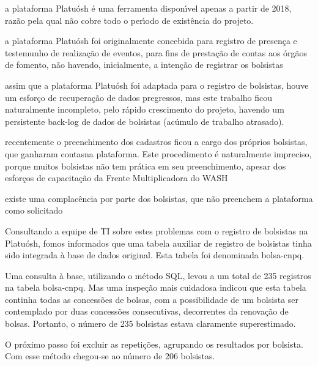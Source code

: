 \documentclass[
12pt,		%
openright,	%
twoside,  %
a4paper,			%
chapter=TITLE,		%
english,			%
french,				%
spanish,			%
brazil				%
]{USPSC-classe/USPSC}
\begin{document}
\begin{alineas}
\item a plataforma Platu\'osh \'e uma ferramenta dispon\'{\i}vel apenas a partir de 2018, raz\~ao pela qual n\~ao cobre todo o per\'{\i}odo de exist\^encia do projeto.
\item a plataforma Platu\'osh foi originalmente concebida para registro de presen\c{c}a e testemunho de realiza\c{c}\~ao de eventos, para fins de presta\c{c}\~ao de contas aos \'org\~aos de fomento, n\~ao havendo, inicialmente, a inten\c{c}\~ao de registrar os bolsistas
\item assim que a plataforma Platu\'osh foi adaptada para o registro de bolsistas, houve um esfor\c{c}o de recupera\c{c}\~ao de dados pregressos, mas este trabalho ficou naturalmente incompleto, pelo r\'apido crescimento do projeto, havendo um persistente back-log de dados de bolsistas (ac\'umulo de trabalho atrasado).
\item recentemente o preenchimento dos cadastros ficou a cargo dos pr\'oprios bolsistas, que ganharam \textquotedbl contas\textquotedbl  na plataforma. Este procedimento \'e naturalmente impreciso, porque muitos bolsistas n\~ao tem pr\'atica em seu preenchimento, apesar dos esfor\c{c}os de capacita\c{c}\~ao da Frente Multiplicadora do WASH
\item existe uma complac\^encia por parte dos bolsistas, que n\~ao preenchem a plataforma como solicitado
\end{alineas}

Consultando a equipe de TI sobre estes problemas com o registro de bolsistas na Platu\'osh, fomos informados que uma tabela auxiliar de registro de bolsistas tinha sido integrada \`a base de dados original. Esta tabela foi denominada \textquotedbl bolsa-cnpq\textquotedbl .




Uma consulta \`a base, utilizando o m\'etodo SQL, levou a um total de 235 registros na tabela \textquotedbl bolsa-cnpq\textquotedbl . Mas uma inspe\c{c}\~ao mais cuidadosa indicou que esta tabela continha todas as concess\~oes de bolsas, com a possibilidade de um bolsista ser contemplado por duas concess\~oes consecutivas, decorrentes da renova\c{c}\~ao de bolsas. Portanto, o n\'umero de 235 bolsistas estava claramente superestimado.




O pr\'oximo passo foi excluir as repeti\c{c}\~oes, agrupando os resultados por bolsista. Com esse m\'etodo chegou-se ao n\'umero de 206 bolsistas.
\end{document}

